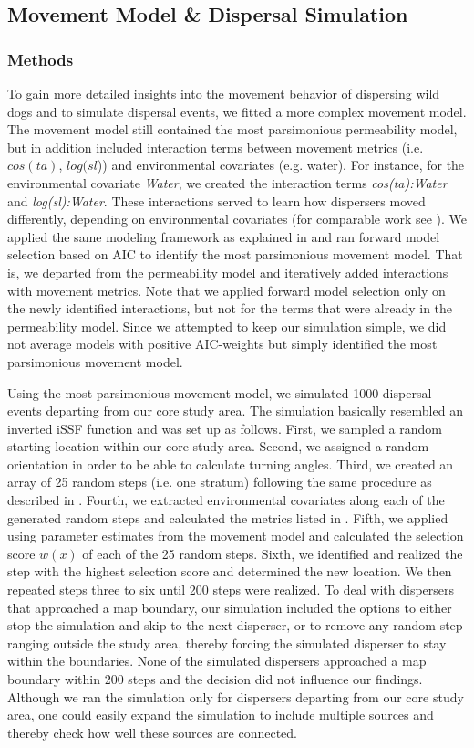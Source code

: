 \documentclass[abstract=on,10pt,a4paper,bibliography=totocnumbered]{scrartcl}
\begin{document}
\newpage
\subsection{Movement Model \& Dispersal Simulation}
\label{Appendix:DispersalSimulation}
\subsubsection{Methods}
To gain more detailed insights into the movement behavior of dispersing wild
dogs and to simulate dispersal events, we fitted a more complex movement model.
The movement model still contained the most parsimonious permeability model, but
in addition included interaction terms between movement metrics (i.e.
\(cos(ta)\), \(log(sl\))) and environmental covariates (e.g. water). For
instance, for the environmental covariate \textit{Water}, we created the
interaction terms \textit{cos(ta):Water} and \textit{log(sl):Water}. These
interactions served to learn how dispersers moved differently, depending on
environmental covariates (for comparable work see \cite{Prokopenko.2017}). We
applied the same modeling framework as explained in  and ran
forward model selection based on AIC to identify the most parsimonious movement
model. That is, we departed from the permeability model and iteratively added
interactions with movement metrics. Note that we applied forward model selection
only on the newly identified interactions, but not for the terms that were
already in the permeability model. Since we attempted to keep our simulation
simple, we did not average models with positive AIC-weights but simply
identified the most parsimonious movement model.

Using the most parsimonious movement model, we simulated 1000 dispersal events
departing from our core study area. The simulation basically resembled an
inverted iSSF function and was set up as follows. First, we sampled a random
starting location within our core study area. Second, we assigned a random
orientation in order to be able to calculate turning angles. Third, we created
an array of 25 random steps (i.e. one stratum) following the same procedure as
described in . Fourth, we extracted environmental covariates
along each of the generated random steps and calculated the metrics listed in
. Fifth, we applied  using parameter estimates
from the movement model and calculated the selection score \(w(x)\) of each of
the 25 random steps. Sixth, we identified and realized the step with the highest
selection score and determined the new location. We then repeated steps three to
six until 200 steps were realized. To deal with dispersers that approached a map
boundary, our simulation included the options to either stop the simulation and
skip to the next disperser, or to remove any random step ranging outside the
study area, thereby forcing the simulated disperser to stay within the
boundaries. None of the simulated dispersers approached a map boundary within
200 steps and the decision did not influence our findings. Although we ran the
simulation only for dispersers departing from our core study area, one could
easily expand the simulation to include multiple sources and thereby check how
well these sources are connected.
\end{document}
